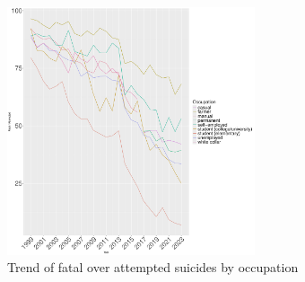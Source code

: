 \documentclass{article}
\begin{document}
\begin{figure}[H]
    \centering
    \includegraphics[width=0.65\textwidth]{imgs/job_foa.pdf}
    \caption{Trend of fatal over attempted suicides by occupation}
    \label{fig:job_foa}
\end{figure}
\end{document}
